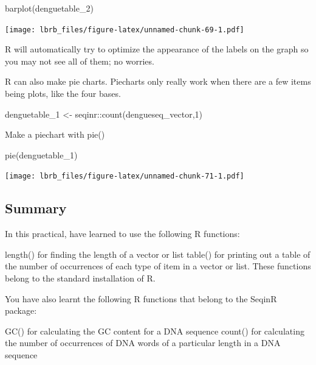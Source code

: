 \documentclass[
]{book}
\newenvironment{Shaded}{\begin{snugshade}}{\end{snugshade}}
\newcommand{\DecValTok}[1]{\textcolor[rgb]{0.00,0.00,0.81}{#1}}
\newcommand{\FunctionTok}[1]{\textcolor[rgb]{0.00,0.00,0.00}{#1}}
\newcommand{\NormalTok}[1]{#1}
\newcommand{\OtherTok}[1]{\textcolor[rgb]{0.56,0.35,0.01}{#1}}
\newcommand{\SpecialCharTok}[1]{\textcolor[rgb]{0.00,0.00,0.00}{#1}}
\begin{document}
\begin{Shaded}
\begin{Highlighting}[]
\FunctionTok{barplot}\NormalTok{(denguetable\_2)}
\end{Highlighting}
\end{Shaded}

\texttt{[image: lbrb\_files/figure-latex/unnamed-chunk-69-1.pdf]}

R will automatically try to optimize the appearance of the labels on the graph so you may not see all of them; no worries.

R can also make pie charts. Piecharts only really work when there are a few items being plots, like the four bases.

\begin{Shaded}
\begin{Highlighting}[]
\NormalTok{denguetable\_1 }\OtherTok{\textless{}{-}}\NormalTok{ seqinr}\SpecialCharTok{::}\FunctionTok{count}\NormalTok{(dengueseq\_vector,}\DecValTok{1}\NormalTok{)}
\end{Highlighting}
\end{Shaded}

Make a piechart with pie()

\begin{Shaded}
\begin{Highlighting}[]
\FunctionTok{pie}\NormalTok{(denguetable\_1)}
\end{Highlighting}
\end{Shaded}

\texttt{[image: lbrb\_files/figure-latex/unnamed-chunk-71-1.pdf]}

\hypertarget{summary}{%
\subsection{Summary}\label{summary}}

In this practical, have learned to use the following R functions:

length() for finding the length of a vector or list
table() for printing out a table of the number of occurrences of each type of item in a vector or list.
These functions belong to the standard installation of R.

You have also learnt the following R functions that belong to the SeqinR package:

GC() for calculating the GC content for a DNA sequence
count() for calculating the number of occurrences of DNA words of a particular length in a DNA sequence
\end{document}
